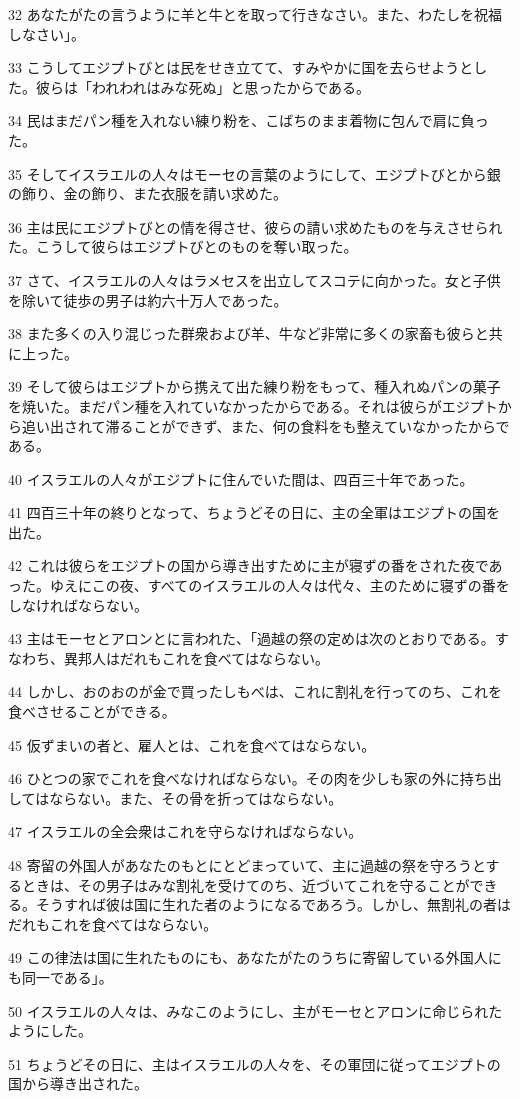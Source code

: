 \par 32 あなたがたの言うように羊と牛とを取って行きなさい。また、わたしを祝福しなさい」。
\par 33 こうしてエジプトびとは民をせき立てて、すみやかに国を去らせようとした。彼らは「われわれはみな死ぬ」と思ったからである。
\par 34 民はまだパン種を入れない練り粉を、こばちのまま着物に包んで肩に負った。
\par 35 そしてイスラエルの人々はモーセの言葉のようにして、エジプトびとから銀の飾り、金の飾り、また衣服を請い求めた。
\par 36 主は民にエジプトびとの情を得させ、彼らの請い求めたものを与えさせられた。こうして彼らはエジプトびとのものを奪い取った。
\par 37 さて、イスラエルの人々はラメセスを出立してスコテに向かった。女と子供を除いて徒歩の男子は約六十万人であった。
\par 38 また多くの入り混じった群衆および羊、牛など非常に多くの家畜も彼らと共に上った。
\par 39 そして彼らはエジプトから携えて出た練り粉をもって、種入れぬパンの菓子を焼いた。まだパン種を入れていなかったからである。それは彼らがエジプトから追い出されて滞ることができず、また、何の食料をも整えていなかったからである。
\par 40 イスラエルの人々がエジプトに住んでいた間は、四百三十年であった。
\par 41 四百三十年の終りとなって、ちょうどその日に、主の全軍はエジプトの国を出た。
\par 42 これは彼らをエジプトの国から導き出すために主が寝ずの番をされた夜であった。ゆえにこの夜、すべてのイスラエルの人々は代々、主のために寝ずの番をしなければならない。
\par 43 主はモーセとアロンとに言われた、「過越の祭の定めは次のとおりである。すなわち、異邦人はだれもこれを食べてはならない。
\par 44 しかし、おのおのが金で買ったしもべは、これに割礼を行ってのち、これを食べさせることができる。
\par 45 仮ずまいの者と、雇人とは、これを食べてはならない。
\par 46 ひとつの家でこれを食べなければならない。その肉を少しも家の外に持ち出してはならない。また、その骨を折ってはならない。
\par 47 イスラエルの全会衆はこれを守らなければならない。
\par 48 寄留の外国人があなたのもとにとどまっていて、主に過越の祭を守ろうとするときは、その男子はみな割礼を受けてのち、近づいてこれを守ることができる。そうすれば彼は国に生れた者のようになるであろう。しかし、無割礼の者はだれもこれを食べてはならない。
\par 49 この律法は国に生れたものにも、あなたがたのうちに寄留している外国人にも同一である」。
\par 50 イスラエルの人々は、みなこのようにし、主がモーセとアロンに命じられたようにした。
\par 51 ちょうどその日に、主はイスラエルの人々を、その軍団に従ってエジプトの国から導き出された。

